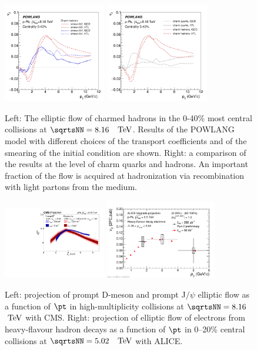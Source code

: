 \begin{figure}[ht]
\centering
\includegraphics[width=0.4\textwidth]{hf/figures/v2cD_pPb8TeV_smear.pdf}
\includegraphics[width=0.4\textwidth]{hf/figures/v2cD_pPb8TeV_HTLvslQCD.pdf}
\caption{
Left: The elliptic flow of charmed hadrons in the 0-40\% most central \pPb collisions at $\sqrtsNN=8.16$~$~\text{TeV}$. Results of the POWLANG model with different choices of the transport coefficients and of the smearing of the initial condition are shown. 
Right: a comparison of the results at the level of charm quarks and hadrons. An important fraction of the flow is acquired at hadronization via recombination with light partons from the medium.}
\label{fig:POWLANG-small2}
\end{figure}
\begin{figure}[ht]
\centering
\includegraphics[width=0.4\textwidth]{hf/figures/v2vspt_DJpsi_projection.pdf}
\includegraphics[width=0.43\textwidth]{hf/figures/2017-Oct-30-HFev2Plot.pdf}
\caption{
Left: projection of prompt D-meson and prompt J$/\psi$ elliptic flow as a function of $\pt$ in high-multiplicity \pPb collisions at $\sqrtsNN=8.16$~$~\text{TeV}$ with CMS.
Right: projection of elliptic flow of electrons from heavy-flavour hadron decays as a function of $\pt$ in 0--20\% central \pPb collisions at $\sqrtsNN=5.02$~$~\text{TeV}$ with ALICE.}
\label{fig:elliptic-data}
\end{figure}
